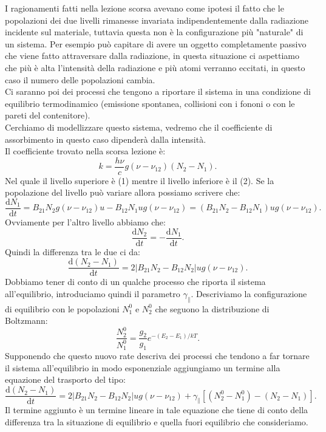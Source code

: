 I ragionamenti fatti nella lezione scorsa avevano come ipotesi il fatto che le popolazioni dei due livelli rimanesse invariata indipendentemente dalla radiazione incidente sul materiale, tuttavia questa non è la configurazione più "naturale" di un sistema. Per esempio può capitare di avere un oggetto completamente passivo che viene fatto attraversare dalla radiazione, in questa situazione ci aspettiamo che più è alta l'intensità della radiazione e più atomi verranno eccitati, in questo caso il numero delle popolazioni cambia.\\
Ci saranno poi dei processi che tengono a riportare il sistema in una condizione di equilibrio termodinamico (emissione spontanea, collisioni con i fononi o con le pareti del contenitore).\\
Cerchiamo di modellizzare questo sistema, vedremo che il coefficiente di assorbimento in questo caso dipenderà dalla intensità.\\
Il coefficiente trovato nella scorsa lezione è:
\[
    k = \frac{h\nu}{c}g(\nu-\nu_{12}) \left(N_2-N_1\right)
.\] 
Nel quale il livello superiore è (1) mentre il livello inferiore è il (2).
Se la popolazione del livello può variare allora possiamo scrivere che:
\[
    \frac{\text{d} N_1}{\text{d} t} = B_{21}N_2g(\nu-\nu_{12}) u 
    -B_{12}N_1 u g(\nu-\nu_{12}) =
    \left(B_{21}N_2- B_{12}N_1\right)ug(\nu-\nu_{12}) 
.\] 
Ovviamente per l'altro livello abbiamo che:
\[
    \frac{\text{d} N_2}{\text{d} t} = -\frac{\text{d} N_1}{\text{d} t}
.\] 
Quindi la differenza tra le due ci da:
\[
    \frac{\text{d} \left(N_2-N_1\right)}{\text{d} t} =
    2\left|B_{21}N_2-B_{12}N_2\right|u g(\nu-\nu_{12}) 
.\] 
Dobbiamo tener di conto di un qualche processo che riporta il sistema all'equilibrio, introduciamo quindi il parametro $\gamma_{\parallel}$. Descriviamo la configurazione di equilibrio con le popolazioni $N_1^0$ e $N_2^0$ che seguono la distribuzione di Boltzmann:
\[
    \frac{N_2^0}{N_1^0} = \frac{g_2}{g_1}e^{-\left(E_2-E_1\right) /kT}
.\] 
Supponendo che questo nuovo rate descriva dei processi che tendono a far tornare il sistema all'equilibrio in modo esponenziale aggiungiamo un termine alla equazione del trasporto del tipo:
\[
    \frac{\text{d} \left(N_2-N_1\right)}{\text{d} t} =
    2\left|B_{21}N_2-B_{12}N_2\right|u g(\nu-\nu_{12}) 
    +\gamma_{\parallel}\left[\left(N_2^0-N_1^0\right)-
    \left(N_2-N_1\right)\right]
.\] 
Il termine aggiunto è un termine lineare in tale equazione che tiene di conto della differenza tra la situazione di equilibrio e quella fuori equilibrio che consideriamo.\\
